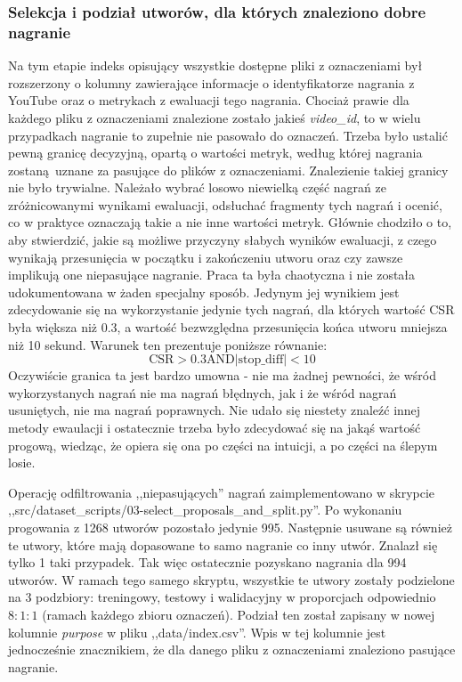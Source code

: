 \subsubsection{Selekcja i podział utworów, dla których znaleziono dobre nagranie}
Na tym etapie indeks opisujący wszystkie dostępne pliki z oznaczeniami był rozszerzony o kolumny
zawierające informacje o identyfikatorze nagrania z YouTube oraz o metrykach z ewaluacji tego
nagrania. Chociaż prawie dla każdego pliku z oznaczeniami znalezione zostało jakieś
\emph{video\_id}, to w wielu przypadkach nagranie to zupełnie nie pasowało do oznaczeń. Trzeba było
ustalić pewną granicę decyzyjną, opartą o wartości metryk, według której nagrania zostaną uznane za
pasujące do plików z oznaczeniami. Znalezienie takiej granicy nie było trywialne. Należało wybrać
losowo niewielką część nagrań ze zróżnicowanymi wynikami ewaluacji, odsłuchać fragmenty tych nagrań
i ocenić, co w praktyce oznaczają takie a nie inne wartości metryk. Głównie chodziło o to, aby
stwierdzić, jakie są możliwe przyczyny słabych wyników ewaluacji, z czego wynikają przesunięcia w
początku i zakończeniu utworu oraz czy zawsze implikują one niepasujące nagranie. Praca ta była
chaotyczna i nie została udokumentowana w żaden specjalny sposób. Jedynym jej wynikiem jest
zdecydowanie się na wykorzystanie jedynie tych nagrań, dla których wartość CSR była większa niż
0.3, a wartość bezwzględna przesunięcia końca utworu mniejsza niż 10 sekund. Warunek ten prezentuje
poniższe równanie:
\begin{equation}
    \textrm{CSR} > 0.3 \textrm{AND} |\textrm{stop\_diff}| < 10
\end{equation}
Oczywiście granica ta jest bardzo umowna - nie ma żadnej pewności, że wśród wykorzystanych nagrań
nie ma nagrań błędnych, jak i że wśród nagrań usuniętych, nie ma nagrań poprawnych. Nie udało się
niestety znaleźć innej metody ewaulacji i ostatecznie trzeba było zdecydować się na jakąś wartość
progową, wiedząc, że opiera się ona po części na intuicji, a po części na ślepym losie.

Operację odfiltrowania ,,niepasujących'' nagrań zaimplementowano w skrypcie
,,src/dataset\_scripts/03-select\_proposals\_and\_split.py''. Po wykonaniu progowania z 1268 utworów
pozostało jedynie 995. Następnie usuwane są również te utwory, które mają dopasowane to samo
nagranie co inny utwór. Znalazł się tylko 1 taki przypadek. Tak więc ostatecznie pozyskano nagrania
dla 994 utworów. W ramach tego samego skryptu, wszystkie te utwory zostały podzielone na 3
podzbiory: treningowy, testowy i walidacyjny w proporcjach odpowiednio $8:1:1$ (ramach każdego
zbioru oznaczeń). Podział ten został zapisany w nowej kolumnie \emph{purpose} w pliku
,,data/index.csv''. Wpis w tej kolumnie jest jednocześnie znacznikiem, że dla danego pliku z
oznaczeniami znaleziono pasujące nagranie.

